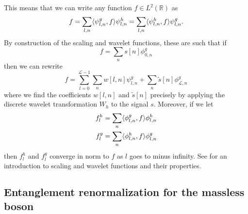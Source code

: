 \documentclass[submission, Phys]{SciPost}
\theoremstyle{definition}
\theoremstyle{remark}
\DeclarePairedDelimiter{\braket}{\langle}{\rangle}
\newcommand{\RR}{\mathbb R}
\newcommand{\cL}{\mathcal L}
\newcommand{\change}[1]{#1}
\begin{document}
\change{This means that we can write any function $f \in L^2(\RR)$ as
\begin{equation*}
  f = \sum_{l,n} \braket{\psi^g_{l,n}, f} \psi^h_{l,n} = \sum_{l,n} \braket{\psi^h_{l,n}, f} \psi^g_{l,n}.
\end{equation*}
By construction of the scaling and wavelet functions, these are such that if
\begin{equation*}
  f = \sum_{n} s[n] \phi^g_{0,n}
\end{equation*}
then we can rewrite
\begin{equation}\label{eq:cont to discrete}
  f = \sum_{l=0}^{\cL-1} \sum_n w[l,n]\psi^g_{l,n} + \sum_n \tilde{s}[n] \phi^g_{\cL,n}
\end{equation}
where we find the coefficients $w[l,n]$ and $\tilde{s}[n]$ precisely by applying the discrete wavelet transformation $W_h$ to the signal $s$.
Moreover, if we let
\begin{align}\label{eq:convergence scaling projection}
  f^h_l &= \sum_n \braket{\phi^g_{l,n}, f} \phi^h_{l,n}\\
  f^g_l &= \sum_n \braket{\phi^h_{l,n}, f} \phi^g_{l,n}
\end{align}
then $f^h_l$ and $f^g_l$ converge in norm to $f$ as $l$ goes to minus infinity.
See \cite{mallat2008wavelet} for an introduction to scaling and wavelet functions and their properties.
}

\subsection{Entanglement renormalization for the massless boson}
\end{document}
